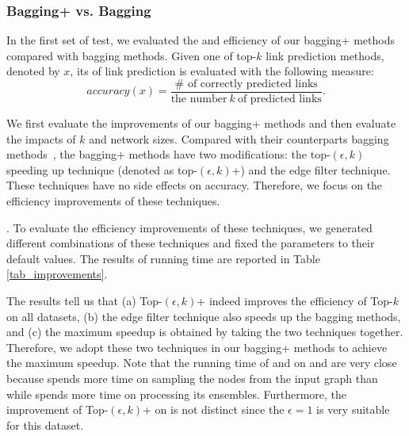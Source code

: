 \subsubsection{Bagging+ vs. Bagging}
In the first set of test, we evaluated the  and efficiency of our bagging+ methods
compared with bagging methods. Given one of top-$k$ link prediction methods, denoted by $x$, its 
of link prediction is evaluated with the following measure:
\begin{equation}
accuracy(x) = \frac{\# \textrm{ of correctly predicted links}}{\textrm{the number} \ k\ \textrm{of predicted links}}.
\end{equation}


We first evaluate the improvements of our bagging+ methods and then
evaluate the impacts of $k$ and network sizes.
Compared with their counterparts bagging methods~\cite{liang2016}, the bagging+ methods have two modifications:
the top-$(\epsilon, k)$ speeding up technique (denoted as top-$(\epsilon, k)$+) and the edge filter technique.
These techniques have no side effects on accuracy.
Therefore, we focus on the efficiency improvements of these techniques.


. To evaluate the
efficiency improvements of these techniques, we generated different combinations
of these techniques and fixed the parameters to their default values.
The results of running time are reported in Table \ref{tab_improvements}.

The results tell us that (a) Top-$(\epsilon, k)$+ indeed improves
the efficiency of Top-$k$ on all datasets,
(b) the edge filter technique also speeds up the bagging methods,
and (c) the maximum speedup is obtained by taking the
two techniques together. Therefore, we adopt these two techniques
in our bagging+ methods to achieve the maximum speedup.
Note that the running time of \Biasedp and \Nodep on \YouTube and \Wikipedia
are very close because \Biasedp spends more time on sampling the nodes
from the input graph than \Nodep while \Nodep spends more time on processing
its ensembles. Furthermore, the improvement of Top-$(\epsilon, k)$+ on \Wikipedia is not
distinct since the $\epsilon = 1$ is very suitable for this dataset.

